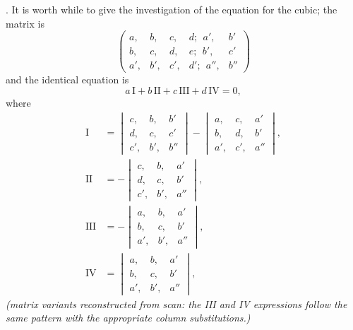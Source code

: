 \documentclass[11pt]{article}
\begin{document}
. It is worth while to give the investigation of the equation for the cubic; the matrix is
\[
\begin{pmatrix}
a, & b, & c, & d;\ \  a', & b'\\
b, & c, & d, & e;\ \  b', & c'\\
a', & b', & c', & d';\ \ a'', & b''
\end{pmatrix}
\]
and the identical equation is
\[
a\,\mathrm{I} + b\,\mathrm{II} + c\,\mathrm{III} + d\,\mathrm{IV} = 0,
\]
where
\[
\begin{aligned}
\mathrm{I} &= \begin{vmatrix} c, & b, & b'\\ d, & c, & c'\\ c', & b', & b'' \end{vmatrix} - \begin{vmatrix} a, & c, & a'\\ b, & d, & b'\\ a', & c', & a'' \end{vmatrix},\\[4pt]
\mathrm{II} &= -\begin{vmatrix} c, & b, & a'\\ d, & c, & b'\\ c', & b', & a'' \end{vmatrix},\\[4pt]
\mathrm{III} &= -\begin{vmatrix} a, & b, & a'\\ b, & c, & b'\\ a', & b', & a'' \end{vmatrix},\\[4pt]
\mathrm{IV} &= \begin{vmatrix} a, & b, & a'\\ b, & c, & b'\\ a', & b', & a'' \end{vmatrix},
\end{aligned}
\]
\textit{(matrix variants reconstructed from scan: the III and IV expressions follow the same pattern with the appropriate column substitutions.)}
\end{document}
